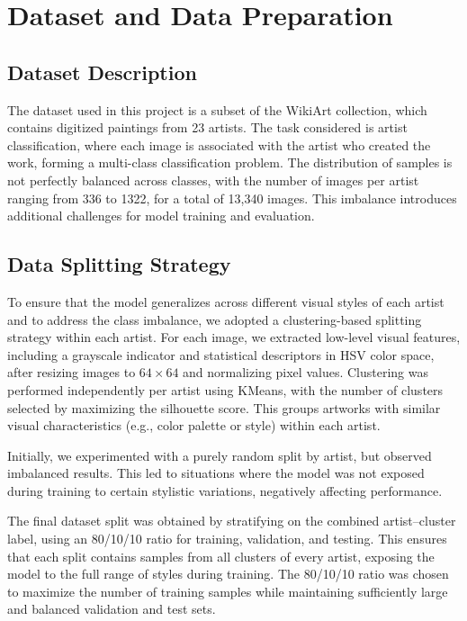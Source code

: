 \documentclass[12pt,a4paper]{article}
\begin{document}
\section{Dataset and Data Preparation}
\subsection{Dataset Description}

The dataset used in this project is a subset of the WikiArt collection, which contains digitized paintings from 23 artists. 
The task considered is artist classification, where each image is associated with the artist who created the work, forming a multi-class classification problem.
The distribution of samples is not perfectly balanced across classes, with the number of images per artist ranging from 336 to 1322, for a total of 13,340 images.
This imbalance introduces additional challenges for model training and evaluation.


\subsection{Data Splitting Strategy}

To ensure that the model generalizes across different visual styles of each artist and to address the class imbalance, we adopted a clustering-based splitting strategy within each artist. 
For each image, we extracted low-level visual features, including a grayscale indicator and statistical descriptors in HSV color space, after resizing images to $64 \times 64$ and normalizing pixel values.
Clustering was performed independently per artist using KMeans, with the number of clusters selected by maximizing the silhouette score. 
This groups artworks with similar visual characteristics (e.g., color palette or style) within each artist.

Initially, we experimented with a purely random split by artist, but observed imbalanced results. 
This led to situations where the model was not exposed during training to certain stylistic variations, negatively affecting performance. 


The final dataset split was obtained by stratifying on the combined artist–cluster label, using an 80/10/10 ratio for training, validation, and testing. 
This ensures that each split contains samples from all clusters of every artist, exposing the model to the full range of styles during training.
The 80/10/10 ratio was chosen to maximize the number of training samples while maintaining sufficiently large and balanced validation and test sets.
\end{document}
